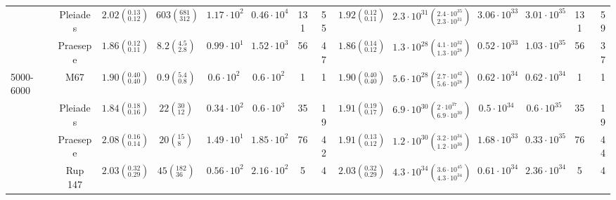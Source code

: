 \begin{tabular}{lccccccccccccr}
          & Pleiades &  $2.02\left(^{0.13}_{0.12}\right)$ &      $603\left(^{681}_{312}\right)$ &    $1.17\cdot 10^{2}$ &    $0.46\cdot 10^{4}$ &                 131 &                  55 &  $1.92\left(^{0.12}_{0.11}\right)$ &  $2.3 \cdot 10^{31}\left(^{2.4 \cdot 10^{35}}_{2.3 \cdot 10^{31}}\right)$ &       $3.06\cdot 10^{33}$ &       $3.01\cdot 10^{35}$ &                   131 &                    59 \\
          & Praesepe &  $1.86\left(^{0.12}_{0.11}\right)$ &            $8.2\left(^{4.5}_{2.8}\right)$ &    $0.99\cdot 10^{1}$ &    $1.52\cdot 10^{3}$ &                  56 &                  47 &  $1.86\left(^{0.14}_{0.12}\right)$ &  $1.3 \cdot 10^{28}\left(^{4.1 \cdot 10^{32}}_{1.3 \cdot 10^{28}}\right)$ &       $0.52\cdot 10^{33}$ &       $1.03\cdot 10^{35}$ &                    56 &                    37 \\
5000-6000 & M67 &  $1.90\left(^{0.40}_{0.40}\right)$ &            $0.9\left(^{5.4}_{0.8}\right)$ &     $0.6\cdot 10^{2}$ &     $0.6\cdot 10^{2}$ &                   1 &                   1 &  $1.90\left(^{0.40}_{0.40}\right)$ &  $5.6 \cdot 10^{28}\left(^{2.7 \cdot 10^{42}}_{5.6 \cdot 10^{28}}\right)$ &       $0.62\cdot 10^{34}$ &       $0.62\cdot 10^{34}$ &                     1 &                     1 \\
          & Pleiades &  $1.84\left(^{0.18}_{0.16}\right)$ &         $22\left(^{30}_{12}\right)$ &    $0.34\cdot 10^{2}$ &     $0.6\cdot 10^{3}$ &                  35 &                  19 &  $1.91\left(^{0.19}_{0.17}\right)$ &    $6.9 \cdot 10^{30}\left(^{2 \cdot 10^{37}}_{6.9 \cdot 10^{30}}\right)$ &        $0.5\cdot 10^{34}$ &        $0.6\cdot 10^{35}$ &                    35 &                    19 \\
          & Praesepe &  $2.08\left(^{0.16}_{0.14}\right)$ &          $20\left(^{15}_{8}\right)$ &    $1.49\cdot 10^{1}$ &    $1.85\cdot 10^{2}$ &                  76 &                  42 &  $1.91\left(^{0.13}_{0.12}\right)$ &  $1.2 \cdot 10^{30}\left(^{3.2 \cdot 10^{34}}_{1.2 \cdot 10^{30}}\right)$ &       $1.68\cdot 10^{33}$ &       $0.33\cdot 10^{35}$ &                    76 &                    44 \\
          & Rup 147 &  $2.03\left(^{0.32}_{0.29}\right)$ &        $45\left(^{182}_{36}\right)$ &    $0.56\cdot 10^{2}$ &    $2.16\cdot 10^{2}$ &                   5 &                   4 &  $2.03\left(^{0.32}_{0.29}\right)$ &  $4.3 \cdot 10^{34}\left(^{3.6 \cdot 10^{45}}_{4.3 \cdot 10^{34}}\right)$ &       $0.61\cdot 10^{34}$ &       $2.36\cdot 10^{34}$ &                     5 &                     4 \\
\hline

\end{tabular}
